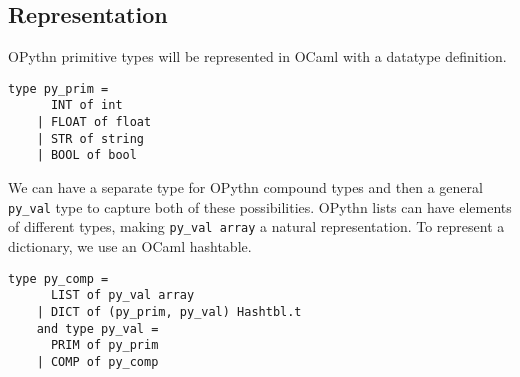 \documentclass[11pt, twoside]{article}
\newcommand{\ms}{\texttt}
\begin{document}
    \subsection{Representation}
    OPythn primitive types will be represented in OCaml with a datatype definition.
    \begin{lstlisting}[language=caml]
    type py_prim =
      INT of int
    | FLOAT of float
    | STR of string
    | BOOL of bool
    \end{lstlisting}
    We can have a separate type for OPythn compound types and then a general \ms{py\_val} type to capture both of these possibilities. OPythn lists can have elements of different types, making \ms{py\_val array} a natural representation. To represent a dictionary, we use an OCaml hashtable.
    \begin{lstlisting}[language=caml]
    type py_comp =
      LIST of py_val array
    | DICT of (py_prim, py_val) Hashtbl.t
    and type py_val =
      PRIM of py_prim
    | COMP of py_comp
    \end{lstlisting}
\end{document}
